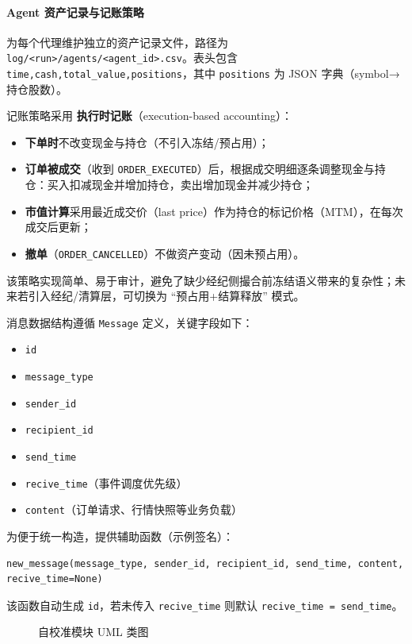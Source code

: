 \paragraph{Agent 资产记录与记账策略}
为每个代理维护独立的资产记录文件，路径为 \verb|log/<run>/agents/<agent_id>.csv|。表头包含 \verb|time,cash,total_value,positions|，其中 \verb|positions| 为 JSON 字典（symbol→持仓股数）。

记账策略采用 \textbf{执行时记账}（execution-based accounting）：
\begin{itemize}
  \item \textbf{下单时}不改变现金与持仓（不引入冻结/预占用）；
  \item \textbf{订单被成交}（收到 \verb|ORDER_EXECUTED|）后，根据成交明细逐条调整现金与持仓：买入扣减现金并增加持仓，卖出增加现金并减少持仓；
  \item \textbf{市值计算}采用最近成交价（last price）作为持仓的标记价格（MTM），在每次成交后更新；
  \item \textbf{撤单}（\verb|ORDER_CANCELLED|）不做资产变动（因未预占用）。
\end{itemize}

该策略实现简单、易于审计，避免了缺少经纪侧撮合前冻结语义带来的复杂性；未来若引入经纪/清算层，可切换为 “预占用+结算释放” 模式。

消息数据结构遵循 \texttt{Message} 定义，关键字段如下：
\begin{itemize}
  \item \texttt{id}
  \item \texttt{message\_type}
  \item \texttt{sender\_id}
  \item \texttt{recipient\_id}
  \item \texttt{send\_time}
  \item \texttt{recive\_time}（事件调度优先级）
  \item \texttt{content}（订单请求、行情快照等业务负载）
\end{itemize}

为便于统一构造，提供辅助函数（示例签名）：
\begin{verbatim}
new_message(message_type, sender_id, recipient_id, send_time, content, recive_time=None)
\end{verbatim}
该函数自动生成 \texttt{id}，若未传入 \texttt{recive\_time} 则默认 \texttt{recive\_time = send\_time}。

\begin{figure}[htbp]
  \centering
  \resizebox{\linewidth}{!}{}
  \caption{自校准模块 UML 类图}
  \label{fig:uml_calibration}
\end{figure}

